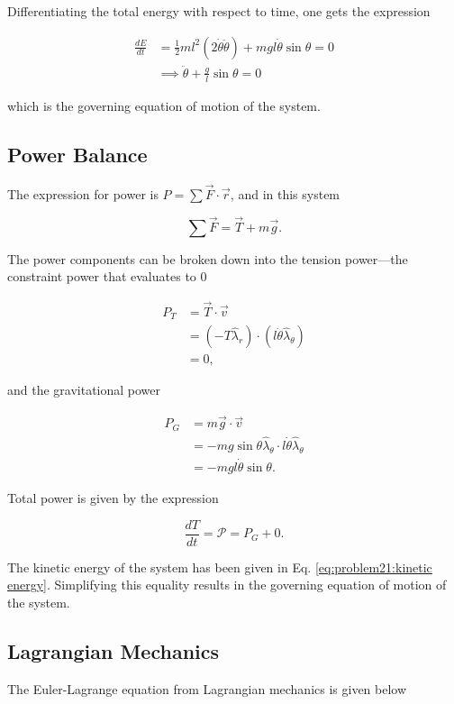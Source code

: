Differentiating the total energy with respect to time, one gets the expression

\begin{align}
    \frac{dE}{dt} &= \frac{1}{2}ml^2\left(2\dot\theta \ddot\theta\right) + mgl\dot\theta\sin\theta = 0 \nonumber \\
    &\implies \ddot\theta + \frac{g}{l}\sin\theta = 0
\end{align}

which is the governing equation of motion of the system.

\subsection{Power Balance}
The expression for power is $P = \sum\vec{F} \cdot \vec{r}$, and in this system

\begin{equation}
    \sum\vec{F} = \vec{T} + m\vec{g}.
\end{equation}

The power components can be broken down into the tension power---the constraint power that evaluates to 0

\begin{align}
    P_T &= \vec{T} \cdot \vec{v} \nonumber \\
    &= \left( -T \hat\lambda_r \right) \cdot \left(l\dot\theta \hat\lambda_\theta\right) \nonumber \\
    &= 0,
\end{align}

and the gravitational power

\begin{align}
    P_G &= m\vec{g} \cdot \vec{v} \nonumber \\
    &= -mg\sin\theta \hat\lambda_\theta \cdot l\dot\theta \hat\lambda_\theta \nonumber \\
    &= -mgl\dot\theta \sin\theta.
\end{align}

Total power is given by the expression

\begin{equation}
    \frac{dT}{dt} = \mathcal{P} = P_G + 0.
\end{equation}

The kinetic energy of the system has been given in Eq. \ref{eq:problem21:kinetic energy}. Simplifying this equality results in the governing equation of motion of the system.

\subsection{Lagrangian Mechanics}
The Euler-Lagrange equation from Lagrangian mechanics is given below

